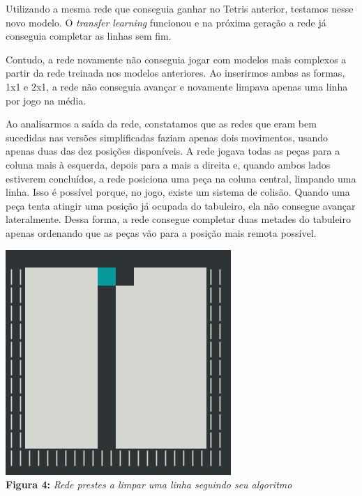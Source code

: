 \documentclass[conference]{IEEEtran}
\begin{document}
Utilizando a mesma rede que conseguia ganhar no Tetris anterior, testamos nesse novo modelo. O \textit{transfer learning} funcionou e na próxima geração a rede já conseguia completar as linhas sem fim.

Contudo, a rede novamente não conseguia jogar com modelos mais complexos a partir da rede treinada nos modelos anteriores. Ao inserirmos ambas as formas, 1x1 e 2x1, a rede não conseguia avançar e novamente limpava apenas uma linha por jogo na média. 

Ao analisarmos a saída da rede, constatamos que as redes que eram bem sucedidas nas versões simplificadas faziam apenas dois movimentos, usando apenas duas das dez posições disponíveis. A rede jogava todas as peças para a coluna mais à esquerda, depois para a mais a direita e, quando ambos lados estiverem concluídos, a rede posiciona uma peça na coluna central, limpando uma linha. Isso é possível porque, no jogo, existe um sistema de colisão. Quando uma peça tenta atingir uma posição já ocupada do tabuleiro, ela não consegue avançar lateralmente. Dessa forma, a rede consegue completar duas metades do tabuleiro apenas ordenando que as peças vão para a posição mais remota possível.

\begin{center}
\includegraphics[scale=0.3]{tetris_win.png}\\

\textbf{Figura 4:} \textit{Rede prestes a limpar uma linha seguindo seu algoritmo}
\end{center}
\end{document}

